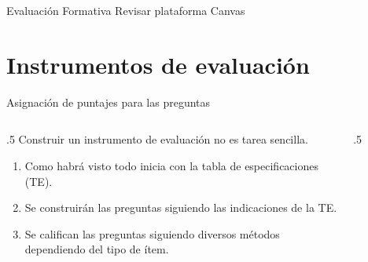 \documentclass[11pt, aspectratio=169, xcolor=table,hyphens]{beamer}
\begin{document}
\begin{frame}{Evaluación Formativa}
	Revisar plataforma Canvas
\end{frame}

\section{Instrumentos de evaluación}

\begin{frame}{Asignación de puntajes para las preguntas}
	\begin{columns}
		\begin{column}{.5\linewidth}
			Construir un instrumento de evaluación no es tarea sencilla.
			\begin{enumerate}[<+->]
				\item Como habrá visto todo inicia con la tabla de especificaciones (TE).
				\item Se construirán las preguntas siguiendo las indicaciones de la TE.
				\item Se califican las preguntas siguiendo diversos métodos dependiendo del tipo de ítem.
			\end{enumerate}
		\end{column}
		\begin{column}{.5\linewidth}
			\begin{figure}
\end{figure}
\end{column}
\end{columns}
\end{frame}
\end{document}
